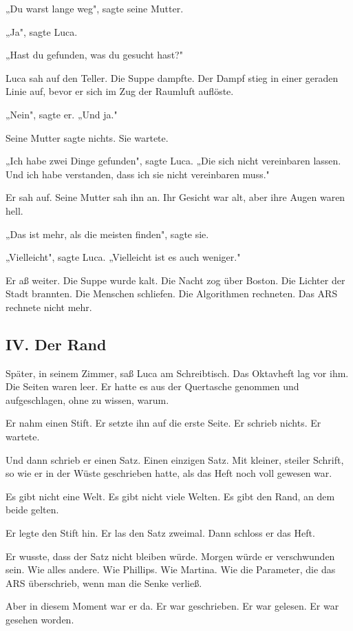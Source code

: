 \documentclass[
  ngerman,
]{article}
\begin{document}
„Du warst lange weg", sagte seine Mutter.

„Ja", sagte Luca.

„Hast du gefunden, was du gesucht hast?"

Luca sah auf den Teller. Die Suppe dampfte. Der Dampf stieg in einer
geraden Linie auf, bevor er sich im Zug der Raumluft auflöste.

„Nein", sagte er. „Und ja."

Seine Mutter sagte nichts. Sie wartete.

„Ich habe zwei Dinge gefunden", sagte Luca. „Die sich nicht vereinbaren
lassen. Und ich habe verstanden, dass ich sie nicht vereinbaren muss."

Er sah auf. Seine Mutter sah ihn an. Ihr Gesicht war alt, aber ihre
Augen waren hell.

„Das ist mehr, als die meisten finden", sagte sie.

„Vielleicht", sagte Luca. „Vielleicht ist es auch weniger."

Er aß weiter. Die Suppe wurde kalt. Die Nacht zog über Boston. Die
Lichter der Stadt brannten. Die Menschen schliefen. Die Algorithmen
rechneten. Das ARS rechnete nicht mehr.

\subsection{IV. Der Rand}\label{iv.-der-rand}

Später, in seinem Zimmer, saß Luca am Schreibtisch. Das Oktavheft lag
vor ihm. Die Seiten waren leer. Er hatte es aus der Quertasche genommen
und aufgeschlagen, ohne zu wissen, warum.

Er nahm einen Stift. Er setzte ihn auf die erste Seite. Er schrieb
nichts. Er wartete.

Und dann schrieb er einen Satz. Einen einzigen Satz. Mit kleiner,
steiler Schrift, so wie er in der Wüste geschrieben hatte, als das Heft
noch voll gewesen war.

Es gibt nicht eine Welt. Es gibt nicht viele Welten. Es gibt den Rand,
an dem beide gelten.

Er legte den Stift hin. Er las den Satz zweimal. Dann schloss er das
Heft.

Er wusste, dass der Satz nicht bleiben würde. Morgen würde er
verschwunden sein. Wie alles andere. Wie Phillips. Wie Martina. Wie die
Parameter, die das ARS überschrieb, wenn man die Senke verließ.

Aber in diesem Moment war er da. Er war geschrieben. Er war gelesen. Er
war gesehen worden.
\end{document}
